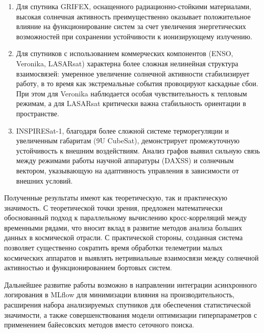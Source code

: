 \begin{enumerate}
	\item Для спутника GRIFEX, оснащенного радиационно-стойкими материалами, высокая солнечная активность преимущественно оказывает положительное влияние на функционирование систем за счет увеличения энергетических возможностей при сохранении устойчивости к ионизирующему излучению.

	\item Для спутников с использованием коммерческих компонентов (ENSO, Veronika, LASARsat) характерна более сложная нелинейная структура взаимосвязей: умеренное увеличение солнечной активности стабилизирует работу, в то время как экстремальные события провоцируют каскадные сбои. При этом для Veronika наблюдается особая чувствительность к тепловым режимам, а для LASARsat критически важна стабильность ориентации в пространстве.

	\item INSPIRESat-1, благодаря более сложной системе терморегуляции и увеличенным габаритам (9U CubeSat), демонстрирует промежуточную устойчивость к внешним воздействиям. Анализ графов выявил сильную связь между режимами работы научной аппаратуры (DAXSS) и солнечным вектором, указывающую на адаптивность управления в зависимости от внешних условий.
\end{enumerate}

Полученные результаты имеют как теоретическую, так и практическую значимость. С
теоретической точки зрения, предложен математически обоснованный подход к
параллельному вычислению кросс-корреляций между временными рядами, что вносит
вклад в развитие методов анализа больших данных в космической отрасли. С
практической стороны, созданная система позволяет существенно сократить время
обработки телеметрии малых космических аппаратов и выявлять нетривиальные
взаимосвязи между солнечной активностью и функционированием бортовых систем.

Дальнейшее развитие работы возможно в направлении интеграции асинхронного
логирования в MLflow для минимизации влияния на производительность, расширения
набора анализируемых спутников для обеспечения статистической значимости, а
также совершенствования модели оптимизации гиперпараметров с применением
байесовских методов вместо сеточного поиска.
